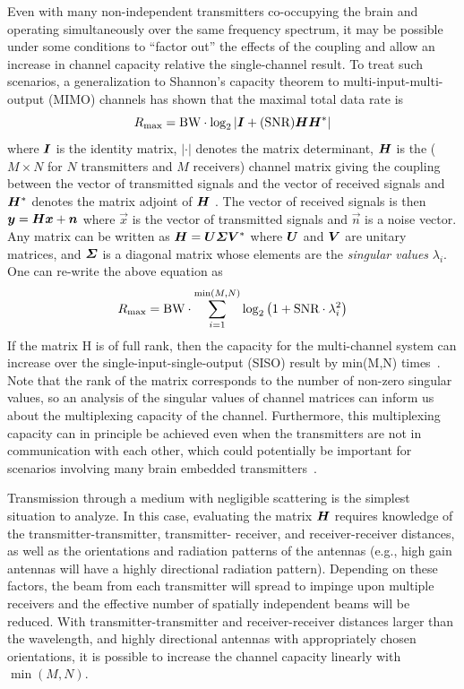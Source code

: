 Even with many non-independent transmitters co-occupying the brain and operating simultaneously over the same frequency spectrum, it may be possible under some conditions to ``factor out'' the effects of the coupling and allow an increase in channel capacity relative the single-channel result.
To treat such scenarios, a generalization to Shannon's capacity theorem to multi-input-multi-output (MIMO) channels has shown that the maximal total data rate is
\[R\sub{max} = \BW \cdot \log_2\left| \mat{I} + ( \SNR ) \mat{H}\mat{H}^* \right|\]
where $\mat{I}$ is the identity matrix, $|\cdot|$ denotes the matrix determinant, $\mat{H}$ is the ($M \times N$ for $N$ transmitters and $M$ receivers) channel matrix giving the coupling between the vector of transmitted signals and the vector of received signals and $\mat{H}^*$ denotes the matrix adjoint of $\mat{H}$ \cite{tulino04}. The vector of received signals is then $\vec{y}=\mat{H}\vec{x}+\vec{n}$ where $\vec{x}$ is the vector of transmitted signals and $\vec{n}$ is a noise vector. Any matrix can be written as $\mat{H}=\mat{U}\mat{\Sigma}\mat{V}^*$ where $\mat{U}$ and $\mat{V}$ are unitary matrices, and $\mat{\Sigma}$ is a diagonal matrix whose elements are the \emph{singular values} $\lambda_i$. One can re-write the above equation as
\[R_{\text{\scriptsize max}} = \text{BW} \cdot \sum_{i=1}^{\min(M,N)} \log_2\left(1+\text{SNR} \cdot \lambda_i^2\right)\]
If the matrix H is of full rank, then the capacity for the multi-channel system can increase over the single-input-single-output (SISO) result by min(M,N) times~\cite{shiu00}.
Note that the rank of the matrix corresponds to the number of non-zero singular values, so an analysis of the singular values of channel matrices can inform us about the multiplexing capacity of the channel.
Furthermore, this multiplexing capacity can in principle be achieved even when the transmitters are not in communication with each other, which could potentially be important for scenarios involving many brain embedded transmitters~\cite{spencer04}.

Transmission through a medium with negligible scattering is the simplest situation to analyze.
In this case, evaluating the matrix $\mat{H}$ requires knowledge of the transmitter-transmitter, transmitter- receiver, and receiver-receiver distances, as well as the orientations and radiation patterns of the antennas (e.g., high gain antennas will have a highly directional radiation pattern).
Depending on these factors, the beam from each transmitter will spread to impinge upon multiple receivers and the effective number of spatially independent beams will be reduced.
With transmitter-transmitter and receiver-receiver distances larger than the wavelength, and highly directional antennas with appropriately chosen orientations, it is possible to increase the channel capacity linearly with $\min(M,N)$.


